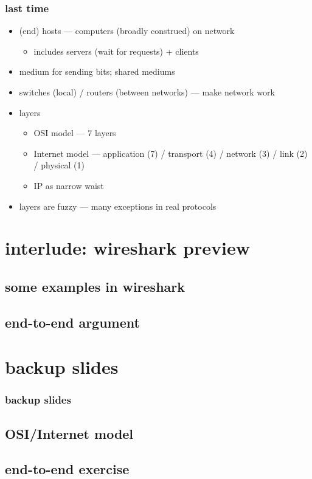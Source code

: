 \date{}
\title{}
\date{}

\begin{frame}
    \titlepage
\end{frame}

\begin{frame}\frametitle{last time}
\begin{itemize}
    \item (end) hosts --- computers (broadly construed) on network
	\begin{itemize}
	\item includes servers (wait for requests) + clients
	\end{itemize}
    \item medium for sending bits; shared mediums
    \item switches (local) / routers (between networks) --- make network work
    \item layers
	\begin{itemize}
	\item OSI model --- 7 layers
	\item Internet model --- application (7) / transport (4) / network (3) / link (2) / physical (1)
	\item IP as narrow waist
	\end{itemize}
    \item layers are fuzzy --- many exceptions in real protocols
\end{itemize}
\end{frame}


\section{interlude: wireshark preview}


\subsection{some examples in wireshark}


\subsection{end-to-end argument}








\section{backup slides}
\begin{frame}\frametitle{backup slides}
\end{frame}

\subsection{OSI/Internet model}


\subsection{end-to-end exercise}








